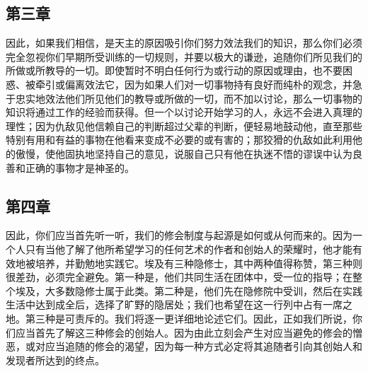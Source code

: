 \subsection{第三章}

\par

因此，如果我们相信，是天主的原因吸引你们努力效法我们的知识，那么你们必须完全忽视你们早期所受训练的一切规则，并要以极大的谦逊，追随你们所见我们的所做或所教导的一切。即使暂时不明白任何行为或行动的原因或理由，也不要困惑、被牵引或偏离效法它，因为如果人们对一切事物持有良好而纯朴的观念，并急于忠实地效法他们所见他们的教导或所做的一切，而不加以讨论，那么一切事物的知识将通过工作的经验而获得。但一个以讨论开始学习的人，永远不会进入真理的理性；因为仇敌见他信赖自己的判断超过父辈的判断，便轻易地鼓动他，直至那些特别有用和有益的事物在他看来变成不必要的或有害的；那狡猾的仇敌如此利用他的傲慢，使他固执地坚持自己的意见，说服自己只有他在执迷不悟的谬误中认为良善和正确的事物才是神圣的。\par


\subsection{第四章}

\par

因此，你们应当首先听一听，我们的修会制度与起源是如何或从何而来的。因为一个人只有当他了解了他所希望学习的任何艺术的作者和创始人的荣耀时，他才能有效地被培养，并勤勉地实践它。埃及有三种隐修士，其中两种值得称赞，第三种则很差劲，必须完全避免。第一种是，他们共同生活在团体中，受一位的指导；在整个埃及，大多数隐修士属于此类。第二种是，他们先在隐修院中受训，然后在实践生活中达到成全后，选择了旷野的隐居处；我们也希望在这一行列中占有一席之地。第三种是可责斥的。我们将逐一更详细地论述它们。因此，正如我们所说，你们应当首先了解这三种修会的创始人。因为由此立刻会产生对应当避免的修会的憎恶，或对应当追随的修会的渴望，因为每一种方式必定将其追随者引向其创始人和发现者所达到的终点。\par


